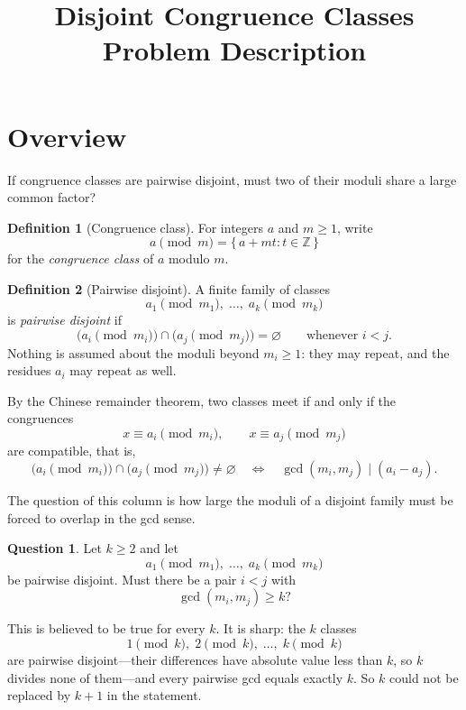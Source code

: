 \documentclass[11pt]{article}
\title{Disjoint Congruence Classes\\[0.4em]\large Problem Description}
\author{}
\date{}
\theoremstyle{definition}
\newtheorem*{definition}{Definition}
\newtheorem*{question}{Question}
\newcommand{\cls}[2]{#1 \pmod{#2}}
\begin{document}
\maketitle

\section*{Overview}

If congruence classes are pairwise disjoint, must two of their moduli
share a large common factor?

\begin{definition}[Congruence class]
For integers $a$ and $m \geq 1$, write
\[
  \cls{a}{m} = \{\, a + mt : t \in \mathbb{Z} \,\}
\]
for the \emph{congruence class} of $a$ modulo $m$.
\end{definition}

\begin{definition}[Pairwise disjoint]
A finite family of classes
\[
  \cls{a_1}{m_1}, \; \ldots, \; \cls{a_k}{m_k}
\]
is \emph{pairwise disjoint} if
\[
  \bigl(\cls{a_i}{m_i}\bigr) \cap \bigl(\cls{a_j}{m_j}\bigr)
  = \varnothing
  \qquad \text{whenever } i < j.
\]
Nothing is assumed about the moduli beyond $m_i \geq 1$: they may
repeat, and the residues $a_i$ may repeat as well.
\end{definition}

By the Chinese remainder theorem, two classes meet if and only if the
congruences
\[
  x \equiv a_i \pmod{m_i},
  \qquad
  x \equiv a_j \pmod{m_j}
\]
are compatible, that is,
\begin{equation}
  \bigl(\cls{a_i}{m_i}\bigr) \cap \bigl(\cls{a_j}{m_j}\bigr)
  \neq \varnothing
  \quad \Longleftrightarrow \quad
  \gcd(m_i, m_j) \mid (a_i - a_j).
  \tag{$*$}\label{eq:intersection}
\end{equation}

The question of this column is how large the moduli of a disjoint
family must be forced to overlap in the gcd sense.

\begin{question}
Let $k \geq 2$ and let
\[
  \cls{a_1}{m_1}, \; \ldots, \; \cls{a_k}{m_k}
\]
be pairwise disjoint. Must there be a pair $i < j$ with
\[
  \gcd(m_i, m_j) \geq k?
\]
\end{question}

This is believed to be true for every $k$. It is sharp: the $k$
classes
\[
  \cls{1}{k}, \; \cls{2}{k}, \; \ldots, \; \cls{k}{k}
\]
are pairwise disjoint---their differences have absolute value less
than $k$, so $k$ divides none of them---and every pairwise gcd equals
exactly $k$. So $k$ could not be replaced by $k + 1$ in the statement.
\end{document}
